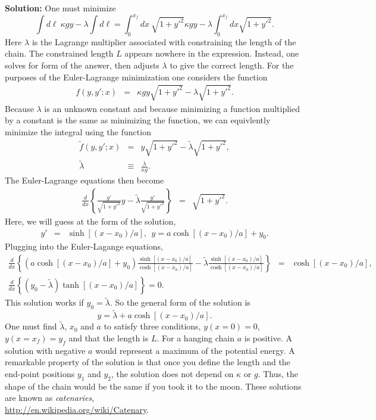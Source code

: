 {\bf Solution:} One must minimize
\[
\int d\ell~\kappa gy-\lambda\int d\ell= \int_0^{x_f}
dx~\sqrt{1+y'^2}\kappa gy-\lambda \int_0^{x_f} dx\sqrt{1+y'^2}.
\]
Here $\lambda$ is the Lagrange multiplier associated with constraining
the length of the chain. The constrained length $L$ appears nowhere in
the expression. Instead, one solves for form of the answer, then
adjusts $\lambda$ to give the correct length. For the purposes of the
Euler-Lagrange minimization one considers the function
\begin{eqnarray}
f(y,y';x)&=&\kappa gy\sqrt{1+y'^2}-\lambda\sqrt{1+y'^2}.
\end{eqnarray}
Because $\lambda$ is an unknown constant and because minimizing a
function multiplied by a constant is the same as minimizing the
function, we can equivlently minimize the integral using the function
\begin{eqnarray}
\tilde{f}(y,y';x)&=&y\sqrt{1+y'^2}-\tilde{\lambda}\sqrt{1+y'^2},\\ \nonumber
\tilde{\lambda}&\equiv&\frac{\lambda}{\kappa g}.
\end{eqnarray}
The Euler-Lagrange equations then become
\begin{eqnarray*}
\frac{d}{dx}\left\{
\frac{y'}{\sqrt{1+y'^2}}y-\tilde{\lambda}\frac{y'}{\sqrt{1+y'^2}}
\right\}&=&\sqrt{1+y'^2}.
\end{eqnarray*}
Here, we will guess at the form of the solution,
\begin{eqnarray*}
y'&=&\sinh[(x-x_0)/a],~~y=a\cosh[(x-x_0)/a]+y_0.
\end{eqnarray*}
Plugging into the Euler-Lagange equations,
\begin{eqnarray*}
\frac{d}{dx}\left\{(a\cosh[(x-x_0)/a]+y_0)\frac{\sinh[(x-x_0)/a]}{\cosh[(x-x_0)/a]}-\tilde{\lambda}\frac{\sinh[(x-x_0)/a]}{\cosh[(x-x_0)/a]}\right\}&=&\cosh[(x-x_0)/a],\\ \nonumber
\frac{d}{dx}\left\{(y_0-\tilde{\lambda})\tanh[(x-x_0)/a]\right\}=0.
\end{eqnarray*}
This solution works if $y_0=\tilde{\lambda}$. So the general form of
the solution is
\[
y=\tilde{\lambda}+a\cosh[(x-x_0)/a].
\]
One must find $\tilde{\lambda}$, $x_0$ and $a$ to satisfy three
conditions, $y(x=0)=0$, $y(x=x_f)=y_f$ and that the length is $L$. For
a hanging chain $a$ is positive. A solution with negative $a$ would
represent a maximum of the potential energy. A remarkable property of
the solution is that once you define the length and the end-point
positions $y_1$ and $y_2$, the solution does not depend on $\kappa$ or
$g$. Thus, the shape of the chain would be the same if you took it to
the moon. These solutions are known as {\it
  catenaries},\\ \href{http://en.wikipedia.org/wiki/Catenary}{http://en.wikipedia.org/wiki/Catenary}.

